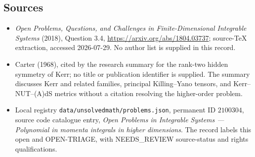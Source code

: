 \documentclass[11pt]{article}
\begin{document}
\subsection{Sources}
\begin{itemize}
\item \emph{Open Problems, Questions, and Challenges in Finite-Dimensional Integrable Systems} (2018), Question 3.4, \url{https://arxiv.org/abs/1804.03737}; source-TeX extraction, accessed 2026-07-29. No author list is supplied in this record.
\item Carter (1968), cited by the research summary for the rank-two hidden symmetry of Kerr; no title or publication identifier is supplied. The summary discusses Kerr and related families, principal Killing--Yano tensors, and Kerr--NUT--(A)dS metrics without a citation resolving the higher-order problem.
\item Local registry \texttt{data/unsolvedmath/problems.json}, permanent ID $2100304$, source code catalogue entry, \emph{Open Problems in Integrable Systems --- Polynomial in momenta integrals in higher dimensions}. The record labels this open and OPEN-TRIAGE, with NEEDS\_REVIEW source-status and rights qualifications.
\end{itemize}
\end{document}
